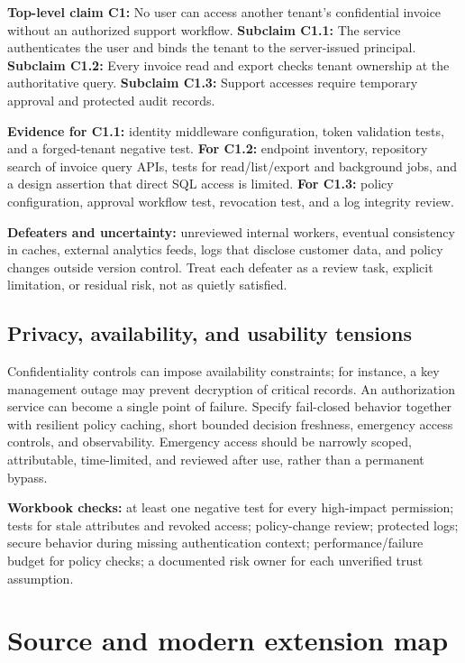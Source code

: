 \documentclass[
  letterpaper,
]{article}
\begin{document}
\textbf{Top-level claim C1:} No user can access another tenant's
confidential invoice without an authorized support workflow.
\textbf{Subclaim C1.1:} The service authenticates the user and binds the
tenant to the server-issued principal. \textbf{Subclaim C1.2:} Every
invoice read and export checks tenant ownership at the authoritative
query. \textbf{Subclaim C1.3:} Support accesses require temporary
approval and protected audit records.

\textbf{Evidence for C1.1:} identity middleware configuration, token
validation tests, and a forged-tenant negative test. \textbf{For C1.2:}
endpoint inventory, repository search of invoice query APIs, tests for
read/list/export and background jobs, and a design assertion that direct
SQL access is limited. \textbf{For C1.3:} policy configuration, approval
workflow test, revocation test, and a log integrity review.

\textbf{Defeaters and uncertainty:} unreviewed internal workers,
eventual consistency in caches, external analytics feeds, logs that
disclose customer data, and policy changes outside version control.
Treat each defeater as a review task, explicit limitation, or residual
risk, not as quietly satisfied.

\subsection{Privacy, availability, and usability
tensions}\label{privacy-availability-and-usability-tensions}

Confidentiality controls can impose availability constraints; for
instance, a key management outage may prevent decryption of critical
records. An authorization service can become a single point of failure.
Specify fail-closed behavior together with resilient policy caching,
short bounded decision freshness, emergency access controls, and
observability. Emergency access should be narrowly scoped, attributable,
time-limited, and reviewed after use, rather than a permanent bypass.

\textbf{Workbook checks:} at least one negative test for every
high-impact permission; tests for stale attributes and revoked access;
policy-change review; protected logs; secure behavior during missing
authentication context; performance/failure budget for policy checks; a
documented risk owner for each unverified trust assumption.

\section{Source and modern extension
map}\label{source-and-modern-extension-map}
\end{document}
